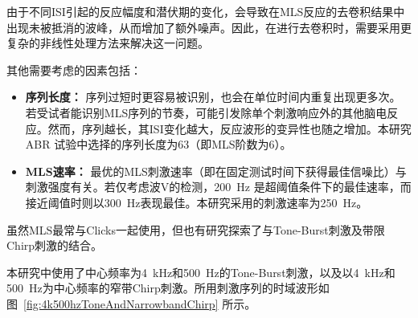 由于不同ISI引起的反应幅度和潜伏期的变化，会导致在MLS反应的去卷积结果中出现未被抵消的波峰，从而增加了额外噪声。因此，在进行去卷积时，需要采用更复杂的非线性处理方法来解决这一问题。

\vspace{0.5em}
\noindent 其他需要考虑的因素包括：

\begin{itemize}
    \item \textbf{序列长度：} 序列过短时更容易被识别，也会在单位时间内重复出现更多次。若受试者能识别MLS序列的节奏，可能引发除单个刺激响应外的其他脑电反应。然而，序列越长，其ISI变化越大，反应波形的变异性也随之增加。本研究 ABR 试验中选择的序列长度为63（即MLS阶数为6）。
    
    \item \textbf{MLS速率：} 最优的MLS刺激速率（即在固定测试时间下获得最佳信噪比）与刺激强度有关。若仅考虑波V的检测，200~Hz 是超阈值条件下的最佳速率，而接近阈值时则以300~Hz表现最佳。本研究采用的刺激速率为250~Hz。
\end{itemize}

虽然MLS最常与Clicks一起使用，但也有研究探索了与Tone-Burst刺激及带限Chirp刺激的结合。

本研究中使用了中心频率为4~kHz和500~Hz的Tone-Burst刺激，以及以4~kHz和500~Hz为中心频率的窄带Chirp刺激。所用刺激序列的时域波形如图~\ref{fig:4k500hzToneAndNarrowbandChirp} 所示。


